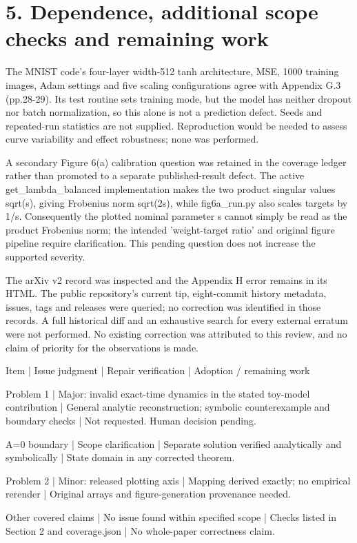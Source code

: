 \documentclass[10pt]{article}
\begin{document}
\section*{5. Dependence, additional scope checks and remaining work}
The MNIST code’s four-layer width-512 tanh architecture, MSE, 1000 training images, Adam settings and five scaling configurations agree with Appendix G.3 (pp.28-29). Its test routine sets training mode, but the model has neither dropout nor batch normalization, so this alone is not a prediction defect. Seeds and repeated-run statistics are not supplied. Reproduction would be needed to assess curve variability and effect robustness; none was performed.\par
A secondary Figure 6(a) calibration question was retained in the coverage ledger rather than promoted to a separate published-result defect. The active get\_lambda\_balanced implementation makes the two product singular values sqrt(s), giving Frobenius norm sqrt(2s), while fig6a\_run.py also scales targets by 1/s. Consequently the plotted nominal parameter s cannot simply be read as the product Frobenius norm; the intended ’weight-target ratio’ and original figure pipeline require clarification. This pending question does not increase the supported severity.\par
The arXiv v2 record was inspected and the Appendix H error remains in its HTML. The public repository’s current tip, eight-commit history metadata, issues, tags and releases were queried; no correction was identified in those records. A full historical diff and an exhaustive search for every external erratum were not performed. No existing correction was attributed to this review, and no claim of priority for the observations is made.\par
Item | Issue judgment | Repair verification | Adoption / remaining work\par
Problem 1 | Major: invalid exact-time dynamics in the stated toy-model contribution | General analytic reconstruction; symbolic counterexample and boundary checks | Not requested. Human decision pending.\par
A=0 boundary | Scope clarification | Separate solution verified analytically and symbolically | State domain in any corrected theorem.\par
Problem 2 | Minor: released plotting axis | Mapping derived exactly; no empirical rerender | Original arrays and figure-generation provenance needed.\par
Other covered claims | No issue found within specified scope | Checks listed in Section 2 and coverage.json | No whole-paper correctness claim.\par
\end{document}
